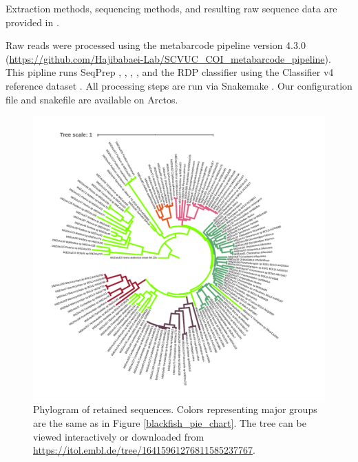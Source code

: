\begin{multicols}{2}
Extraction methods, sequencing methods, and resulting raw sequence data are provided in \citet{BowserBowser2020}.

Raw reads were processed using the   metabarcode pipeline version 4.3.0 (\url{https://github.com/Hajibabaei-Lab/SCVUC_COI_metabarcode_pipeline}). This pipline runs SeqPrep \citep{StJohn2016},  \citep{Martin2011},  \citep{Rognes2016},  \citep{Edgar2016}, and the RDP classifier \citep{Wang2007} using the  Classifier v4 reference dataset \citep{PorterHajibabaei2018}. All processing steps are run via Snakemake \citep{KosterRahmann2012}. Our  configuration file \citep{Bowser2020config} and snakefile \citep{Bowser2020snakefile} are available on Arctos.

\end{multicols}
\begin{figure}[H]
\begin{center}
\includegraphics[width=\textwidth]{img/blackfish_phylo.pdf}
\caption{Phylogram of retained  sequences. Colors representing major groups are the same as in Figure \ref{blackfish_pie_chart}. The tree can be viewed interactively or downloaded from \url{https://itol.embl.de/tree/16415961276811585237767}.}
\label{blackfish_phylo}
\end{center}
\end{figure} 
